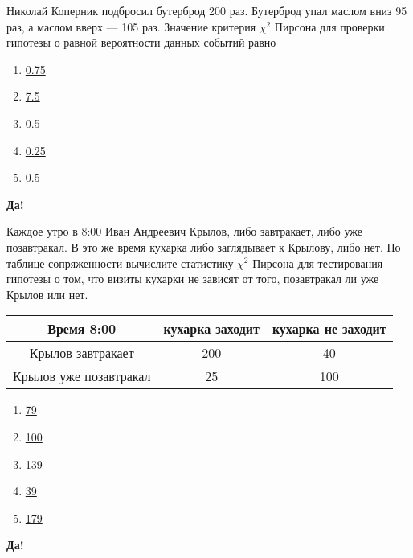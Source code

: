 \documentclass[t]{beamer}
\begin{document}
 \begin{frame} \label{46-Yes} 
\begin{block}{46} 

Николай Коперник подбросил бутерброд 200 раз. Бутерброд упал маслом вниз 95 раз, а маслом вверх — 105 раз. Значение критерия $\chi^2$ Пирсона для проверки гипотезы о равной вероятности данных событий равно
 


 \end{block} 
\begin{enumerate} 
\item[] \hyperlink{46-No}{\beamergotobutton{} 0.75}
\item[] \hyperlink{46-No}{\beamergotobutton{} 7.5}
\item[] \hyperlink{46-No}{\beamergotobutton{} 0.5}
\item[] \hyperlink{46-No}{\beamergotobutton{} 0.25}
\item[] \hyperlink{46-Yes}{\beamergotobutton{} 0.5}
\end{enumerate} 

 \textbf{Да!} 
 \hyperlink{47}{}\end{frame} 


 \begin{frame} \label{47-Yes} 
\begin{block}{47} 

Каждое утро в 8:00 Иван Андреевич Крылов, либо завтракает, либо уже позавтракал. В это же время кухарка либо заглядывает к Крылову, либо нет. По таблице сопряженности вычислите  статистику $\chi^2$ Пирсона для тестирования гипотезы о том, что визиты кухарки не зависят от того, позавтракал ли уже Крылов или нет.
\begin{tabular}{c|cc}
Время 8:00 & кухарка заходит & кухарка не заходит \\
\hline
Крылов завтракает & 200 & 40 \\
Крылов уже позавтракал & 25 & 100 \\
\end{tabular}
 


 \end{block} 
\begin{enumerate} 
\item[] \hyperlink{47-No}{\beamergotobutton{} 79}
\item[] \hyperlink{47-No}{\beamergotobutton{} 100}
\item[] \hyperlink{47-Yes}{\beamergotobutton{} 139}
\item[] \hyperlink{47-No}{\beamergotobutton{} 39}
\item[] \hyperlink{47-No}{\beamergotobutton{} 179}
\end{enumerate} 

 \textbf{Да!} 
 \hyperlink{48}{}\end{frame} 
\end{document}
